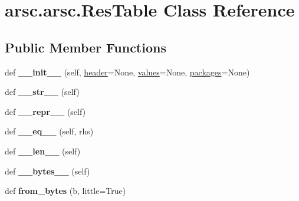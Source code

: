 \hypertarget{classarsc_1_1arsc_1_1ResTable}{}\section{arsc.\+arsc.\+Res\+Table Class Reference}
\label{classarsc_1_1arsc_1_1ResTable}
\subsection*{Public Member Functions}
\begin{DoxyCompactItemize}
\item 
\mbox{\label{classarsc_1_1arsc_1_1ResTable_a4a9dbb3365ae12fc300c7ea77ff949dd}} 
def {\bfseries \+\_\+\+\_\+init\+\_\+\+\_\+} (self, \mbox{\hyperlink{classarsc_1_1arsc_1_1ResTable_aa11889a78793f6d29ad4a7ad35301812}{header}}=None, \mbox{\hyperlink{classarsc_1_1arsc_1_1ResTable_aacbd5386807f5b39a7492bd182eb2319}{values}}=None, \mbox{\hyperlink{classarsc_1_1arsc_1_1ResTable_aac70a39feb4e7ead6bfce81cb4057a9d}{packages}}=None)
\item 
\mbox{\label{classarsc_1_1arsc_1_1ResTable_adc7ea9e5c447ebb9f19422612a60e55d}} 
def {\bfseries \+\_\+\+\_\+str\+\_\+\+\_\+} (self)
\item 
\mbox{\label{classarsc_1_1arsc_1_1ResTable_a93a3d534730b83b4e623515a26ddff6d}} 
def {\bfseries \+\_\+\+\_\+repr\+\_\+\+\_\+} (self)
\item 
\mbox{\label{classarsc_1_1arsc_1_1ResTable_a7f18b07036ce8a91932de9712fed71c9}} 
def {\bfseries \+\_\+\+\_\+eq\+\_\+\+\_\+} (self, rhs)
\item 
\mbox{\label{classarsc_1_1arsc_1_1ResTable_a825fada264ff71a569bf4becd1a6011b}} 
def {\bfseries \+\_\+\+\_\+len\+\_\+\+\_\+} (self)
\item 
\mbox{\label{classarsc_1_1arsc_1_1ResTable_ae9c751a72e47173661bef92cd913640e}} 
def {\bfseries \+\_\+\+\_\+bytes\+\_\+\+\_\+} (self)
\item 
\mbox{\label{classarsc_1_1arsc_1_1ResTable_a65c365e66f3b0b18a1443264ad669510}} 
def {\bfseries from\+\_\+bytes} (b, little=True)
\end{DoxyCompactItemize}
